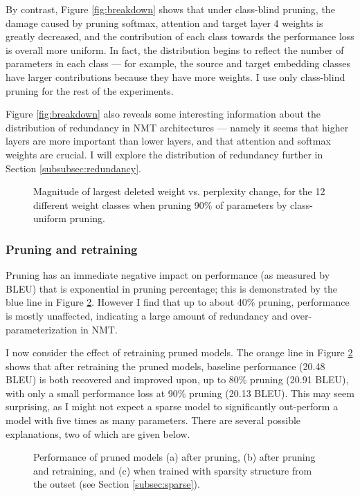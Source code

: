 By contrast, Figure \ref{fig:breakdown} shows that under class-blind pruning, the damage caused by pruning softmax, attention and target layer 4 weights is greatly decreased, and the contribution of each class towards the performance loss is overall more uniform.
In fact, the distribution begins to reflect the number of parameters in each class --- for example, the source and target embedding classes have larger contributions because they have more weights. 
I use only class-blind pruning for the rest of the experiments.

Figure \ref{fig:breakdown} also reveals some interesting information about the
distribution of redundancy in NMT architectures --- namely it seems that higher
layers are more important than lower layers, and that attention and softmax
weights are crucial. I will explore the distribution of redundancy further in
Section \ref{subsubsec:redundancy}.

\begin{figure}
\centering

\caption[Magnitude of largest deleted weight vs. perplexity change]{Magnitude of largest deleted weight vs. perplexity change, for the 12
different weight classes when pruning 90\% of parameters by class-uniform
pruning.}
\label{fig:scatter}
\end{figure}

\subsubsection{Pruning and retraining}
\label{subsec:effect}


Pruning has an immediate negative impact on performance (as measured by BLEU) that is exponential in pruning percentage; this is demonstrated by the blue line in Figure \ref{fig:main_results}.
However I find that up to about 40\% pruning, performance is mostly unaffected, indicating a large amount of redundancy and over-parameterization in NMT.

I now consider the effect of retraining pruned models.
The orange line in Figure \ref{fig:main_results} shows that after retraining the pruned models, baseline performance (20.48 BLEU) is both recovered and improved upon, up to 80\% pruning (20.91 BLEU), with only a small performance loss at 90\% pruning (20.13 BLEU).
This may seem surprising, as I might not expect a sparse model to significantly out-perform a model with five times as many parameters.
There are several possible explanations, two of which are given below.
\begin{figure}
\centering

\caption[Performance of pruned models]{Performance of pruned models (a) after pruning, (b) after pruning and
retraining, and (c) when trained with sparsity structure from the outset (see
Section \ref{subsec:sparse}).}
\label{fig:main_results}
\end{figure}

